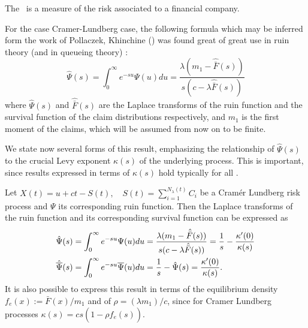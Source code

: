 The \rp \ is a measure of the risk associated to a financial company.

For the case Cramer-Lundberg case, the following formula which may be inferred form the work of Pollaczek, Khinchine (\cite{Rolski}) was found great of great use in ruin theory (and in queueing theory) :
\[\hat \Psi(s) = \int_0^{\infty} e^{-s u} \Psi(u) du
= \frac{\lambda (m_1 - \hat{\bar{F}}(s))}{s (c-\lambda \hat{\bar{F}}(s)) }\]
where $\hat \Psi(s)$ and $\hat{\bar{F}}(s)$ are the Laplace transforms of the ruin function and the survival function of the claim distributions respectively, and $m_1$ is the first moment of the claims, which will be assumed from now on to be finite.

We state now several forms of this result,  emphasizing the relationship of $\hat \Psi(s)$ to the  crucial  Levy exponent $\kappa (s)$ of the underlying process. This is important, since results expressed in terms of $\kappa (s)$ hold typically for all \sn \lev \procs.

\begin{thm}
Let $X(t) = u + ct - S(t), \quad S(t) = \sum_{i=1}^{N_\lambda (t)} C_i$ be a Cram\'er Lundberg risk process and $\Psi$ its corresponding ruin function. Then the Laplace transforms of the ruin function and its corresponding survival function can be expressed as
\begin{align*}
\hat {\Psi}(s) &= \int_0^{\infty} e^{-s u} \Psi(u) du
= \frac{\lambda (m_1 - \hat{\bar{F}}(s))}{s (c-\lambda \hat{\bar{F}}(s)) } = \frac{1}{s}- \frac{ \kappa'(0)}{ \kappa(s)} \\
\hat {\overline{\Psi}}(s) &= \int_0^{\infty} e^{-s u} \overline{\Psi}(u) du = \frac{1}{s} - \hat {\Psi}(s) = \frac{\kappa'(0)}{\kappa(s)}.
\end{align*}
It is also possible to express this result in terms of 
the equilibrium density $f_e(x):=\bar{F}(x)/m_1$ and of $\rho =(\lambda m_1)/c$, since for Cramer Lundberg processes $\kappa(s) =  cs( 1- \rho \hat f_e(s)) $.
\end{thm}
